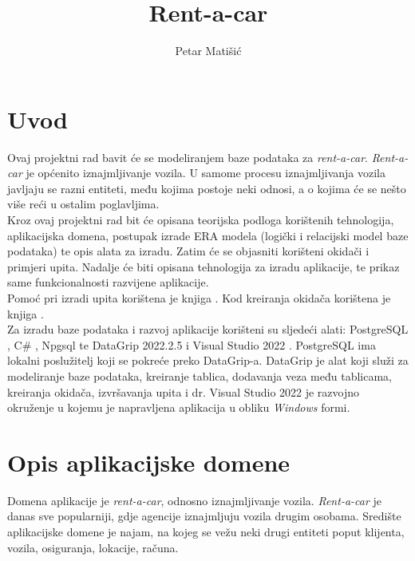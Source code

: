 \documentclass[]{foi}
\title{Rent-a-car}
\author{Petar Matišić}
\begin{document}
\maketitle

\tableofcontents

\makeatletter {} \makeatother
\pagestyle{plain}



\chapter{Uvod}

Ovaj projektni rad bavit će se modeliranjem baze podataka za \textit{rent-a-car}. \textit{Rent-a-car} je općenito iznajmljivanje vozila. U samome procesu iznajmljivanja vozila javljaju se razni entiteti, među kojima postoje neki odnosi, a o kojima će se nešto više reći u ostalim poglavljima.\\

Kroz ovaj projektni rad bit će opisana teorijska podloga korištenih tehnologija, aplikacijska domena, postupak izrade ERA modela (logički i relacijski model baze podataka) te opis alata za izradu. Zatim će se objasniti korišteni okidači i primjeri upita. Nadalje će biti opisana tehnologija za izradu aplikacije, te prikaz same funkcionalnosti razvijene aplikacije.\\

Pomoć pri izradi upita korištena je knjiga \cite{tbp}. Kod kreiranja okidača korištena je knjiga \cite{tbp}.\\

Za izradu baze podataka i razvoj aplikacije korišteni su sljedeći alati: PostgreSQL \cite{postgres}, C\# \cite{microsoft}, Npgsql \cite{npgsql} te DataGrip 2022.2.5 \cite{datagrip} i Visual Studio 2022 \cite{microsoft}. PostgreSQL ima lokalni poslužitelj koji se pokreće preko DataGrip-a. DataGrip je alat koji služi za modeliranje baze podataka, kreiranje tablica, dodavanja veza među tablicama, kreiranja okidača, izvršavanja upita i dr. Visual Studio 2022 je razvojno okruženje u kojemu je napravljena aplikacija u obliku \textit{Windows} formi.

\chapter{Opis aplikacijske domene}

Domena aplikacije je \textit{rent-a-car}, odnosno iznajmljivanje vozila. \textit{Rent-a-car} je danas sve popularniji, gdje agencije iznajmljuju vozila drugim osobama. Središte aplikacijske domene je najam, na kojeg se vežu neki drugi entiteti poput klijenta, vozila, osiguranja, lokacije, računa.
\end{document}
